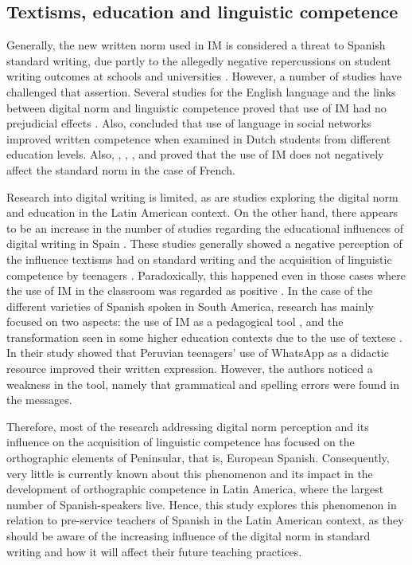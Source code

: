 \documentclass{textolivre}
\begin{document}
\subsection{Textisms, education and linguistic competence}
Generally, the new written norm used in IM is considered a threat to Spanish standard writing, due partly to the allegedly negative repercussions on student writing outcomes at schools and universities \cite{DeJonge2012, Drouin2014, Johnson2015, Thurlow2013}. However, a number of studies have challenged that assertion. Several studies for the English language and the links between digital norm and linguistic competence proved that use of IM had no prejudicial effects \cite{Bushnell2011, Drouin2011, Gann2010, Kemp2011, Plester2009, Powell2011, Wood2014}. Also, \textcite{Verheijen2020} concluded that use of language in social networks improved written competence when examined in Dutch students from different education levels. Also, \textcite{Bouillaud2007}, \textcite{Bernicot2014}, \textcite{Lanchantin2014}, and \textcite{Cougnon2017} proved that the use of IM does not negatively affect the standard norm in the case of French. 

Research into digital writing is limited, as are studies exploring the digital norm and education in the Latin American context. On the other hand, there appears to be an increase in the number of studies regarding the educational influences of digital writing in Spain \cite{Cremades2019b, Llopis-Susierra2020}. These studies generally showed a negative perception of the influence textisms had on standard writing and the acquisition of linguistic competence by teenagers \cite{Gomez-Camacho2018, Hunt-Gomez2020}. Paradoxically, this happened even in those cases where the use of IM in the classroom was regarded as positive \cite{Cremades2019b, Llopis-Susierra2020}. In the case of the different varieties of Spanish spoken in South America, research has mainly focused on two aspects: the use of IM as a pedagogical tool \cite{Escobar-Mamani2020,Gonzalez-Same2019}, and the transformation seen in some higher education contexts due to the use of textese \cite{Veytia-Bucheli2020}. In their study \textcite{Escobar-Mamani2020} showed that Peruvian teenagers’ use of WhatsApp as a didactic resource improved their written expression. However, the authors noticed a weakness in the tool, namely that grammatical and spelling errors were found in the messages.

Therefore, most of the research addressing digital norm perception and its influence on the acquisition of linguistic competence has focused on the orthographic elements of Peninsular, that is, European Spanish. Consequently, very little is currently known about this phenomenon and its impact in the development of orthographic competence in Latin America, where the largest number of Spanish-speakers live. Hence, this study explores this phenomenon in relation to pre-service teachers of Spanish in the Latin American context, as they should be aware of the increasing influence of the digital norm in standard writing and how it will affect their future teaching practices. 
\end{document}
